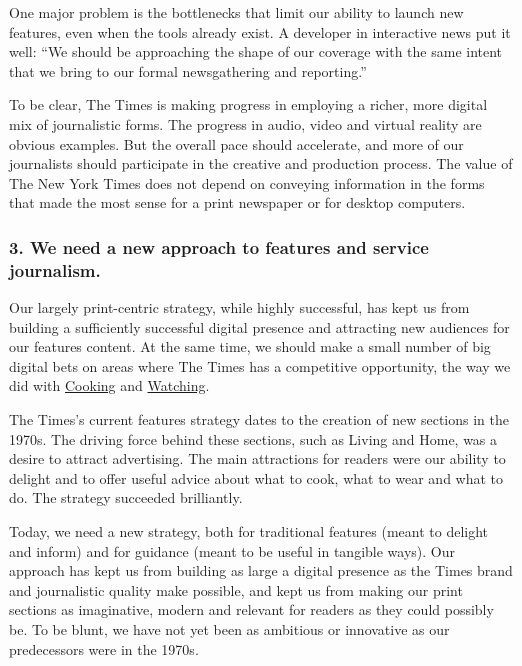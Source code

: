 One major problem is the bottlenecks that limit our ability to launch
new features, even when the tools already exist. A developer in
interactive news put it well: ``We should be approaching the shape of
our coverage with the same intent that we bring to our formal
newsgathering and reporting.''

To be clear, The Times is making progress in employing a richer, more
digital mix of journalistic forms. The progress in audio, video and
virtual reality are obvious examples. But the overall pace should
accelerate, and more of our journalists should participate in the
creative and production process. The value of The New York Times does
not depend on conveying information in the forms that made the most
sense for a print newspaper or for desktop computers.

\hypertarget{3-we-need-a-new-approach-to-features-and-service-journalism}{%
\subsubsection{3. We need a new approach to features and service
journalism.}\label{3-we-need-a-new-approach-to-features-and-service-journalism}}

Our largely print-centric strategy, while highly successful, has kept us
from building a sufficiently successful digital presence and attracting
new audiences for our features content. At the same time, we should make
a small number of big digital bets on areas where The Times has a
competitive opportunity, the way we did with
\href{http://cooking.nytimes3xbfgragh.onion/}{Cooking} and
\href{https://www.nytimes3xbfgragh.onion/watching}{Watching}.

The Times's current features strategy dates to the creation of new
sections in the 1970s. The driving force behind these sections, such as
Living and Home, was a desire to attract advertising. The main
attractions for readers were our ability to delight and to offer useful
advice about what to cook, what to wear and what to do. The strategy
succeeded brilliantly.

Today, we need a new strategy, both for traditional features (meant to
delight and inform) and for guidance (meant to be useful in tangible
ways). Our approach has kept us from building as large a digital
presence as the Times brand and journalistic quality make possible, and
kept us from making our print sections as imaginative, modern and
relevant for readers as they could possibly be. To be blunt, we have not
yet been as ambitious or innovative as our predecessors were in the
1970s.

